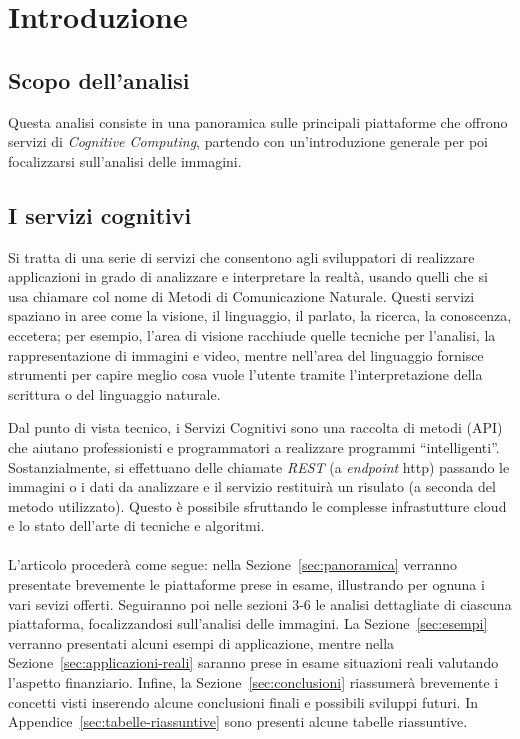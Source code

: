 
\section{Introduzione}\label{sec:introduzione}
\subsection{Scopo dell'analisi}\label{subsec:scopo-analisi}
Questa analisi consiste in una panoramica sulle principali piattaforme che offrono servizi di \textit{Cognitive Computing},
partendo con un'introduzione generale per poi focalizzarsi sull'analisi delle immagini.
%
\subsection{I servizi cognitivi}\label{subsec:i-servizi-cognitivi}
Si tratta di una serie di servizi che consentono agli sviluppatori di realizzare applicazioni in grado di analizzare e interpretare la realtà,
usando quelli che si usa chiamare col nome di Metodi di Comunicazione Naturale.
Questi servizi spaziano in aree come la visione, il linguaggio, il parlato, la ricerca, la conoscenza, eccetera;
per esempio, l'area di visione racchiude quelle tecniche per l'analisi, la rappresentazione di immagini e video, mentre
nell'area del linguaggio fornisce strumenti per capire meglio cosa vuole l'utente tramite l'interpretazione della scrittura o del linguaggio naturale.

Dal punto di vista tecnico, i Servizi Cognitivi sono una raccolta di metodi (API) che aiutano professionisti e programmatori
a realizzare programmi ``intelligenti''.
Sostanzialmente, si effettuano delle chiamate \textit{REST} (a \textit{endpoint} http)
passando le immagini o i dati da analizzare e il servizio restituirà un risulato (a seconda del metodo utilizzato).
Questo è possibile sfruttando le complesse infrastutture cloud e lo stato dell'arte di tecniche e algoritmi.
%
\paragraph*{}
L'articolo procederà come segue: nella Sezione~\ref{sec:panoramica} verranno presentate brevemente le piattaforme prese in esame, illustrando per ognuna i vari sevizi offerti.
Seguiranno poi nelle sezioni 3-6 le analisi dettagliate di ciascuna piattaforma, focalizzandosi sull'analisi delle immagini.
La Sezione~\ref{sec:esempi} verranno presentati alcuni esempi di applicazione, mentre
nella Sezione~\ref{sec:applicazioni-reali} saranno prese in esame situazioni reali valutando l'aspetto finanziario.
Infine, la Sezione~\ref{sec:conclusioni} riassumerà brevemente i concetti visti inserendo alcune conclusioni finali e possibili sviluppi futuri.
In Appendice~\ref{sec:tabelle-riassuntive} sono presenti alcune tabelle riassuntive.
